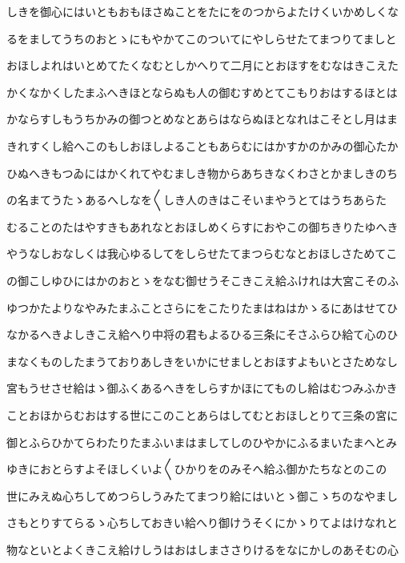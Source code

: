 \documentclass[a4paper,11pt,landscape]{ltjtarticle}
\begin{document}
しきを御心にはいともおもほさぬことをたにをのつからよたけくいかめしくな
\par\medskip
るをましてうちのおとゝにもやかてこのついてにやしらせたてまつりてましと
\par\medskip
おほしよれはいとめてたくなむとしかへりて二月にとおほすをむなはきこえた
\par\medskip
かくなかくしたまふへきほとならぬも人の御むすめとてこもりおはするほとは
\par\medskip
かならすしもうちかみの御つとめなとあらはならぬほとなれはこそとし月はま
\par\medskip
きれすくし給へこのもしおほしよることもあらむにはかすかのかみの御心たか
\par\medskip
ひぬへきもつゐにはかくれてやむましき物からあちきなくわさとかましきのち
\par\medskip
の名まてうたゝあるへしなを〱しき人のきはこそいまやうとてはうちあらた
\par\medskip
むることのたはやすきもあれなとおほしめくらすにおやこの御ちきりたゆへき
\par\medskip
やうなしおなしくは我心ゆるしてをしらせたてまつらむなとおほしさためてこ
\par\medskip
の御こしゆひにはかのおとゝをなむ御せうそこきこえ給ふけれは大宮こそのふ
\par\medskip
ゆつかたよりなやみたまふことさらにをこたりたまはねはかゝるにあはせてひ
\par\medskip
なかるへきよしきこえ給へり中将の君もよるひる三条にそさふらひ給て心のひ
\par\medskip
まなくものしたまうておりあしきをいかにせましとおほすよもいとさためなし
\par\medskip
宮もうせさせ給はゝ御ふくあるへきをしらすかほにてものし給はむつみふかき
\par\medskip
ことおほからむおはする世にこのことあらはしてむとおほしとりて三条の宮に
\par\medskip
御とふらひかてらわたりたまふいまはましてしのひやかにふるまいたまへとみ
\par\medskip
ゆきにおとらすよそほしくいよ〱ひかりをのみそへ給ふ御かたちなとのこの
\par\medskip
世にみえぬ心ちしてめつらしうみたてまつり給にはいとゝ御こゝちのなやまし
\par\medskip
さもとりすてらるゝ心ちしておきい給へり御けうそくにかゝりてよはけなれと
\par\medskip
物なといとよくきこえ給けしうはおはしまささりけるをなにかしのあそむの心
\par\medskip
\end{document}
